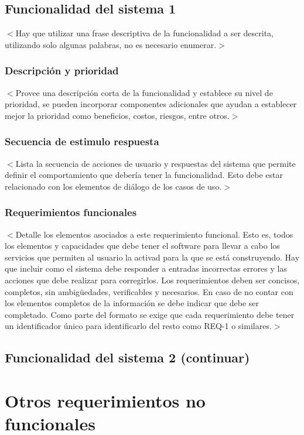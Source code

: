 \documentclass{scrreprt}
\begin{document}
\section{Funcionalidad del sistema 1}
$<$Hay que utilizar una frase descriptiva de la funcionalidad a ser descrita, utilizando solo algunas palabras, no es necesario enumerar.$>$

\subsection{Descripción y prioridad}
$<$Provee una descripción corta de la funcionalidad y establece su nivel de prioridad, se pueden incorporar componentes adicionales que ayudan a establecer mejor la prioridad como beneficios, costos, riesgos, entre otros.$>$

\subsection{Secuencia de estimulo respuesta}
$<$Lista la secuencia de acciones de usuario y respuestas del sistema que permite definir el comportamiento que debería tener la funcionalidad. Esto debe estar relacionado con los elementos de diálogo de los casos de uso.$>$

\subsection{Requerimientos funcionales}
$<$Detalle los elementos asociados a este requerimiento funcional. Esto es, todos los elementos y capacidades que debe tener el software para llevar a cabo los servicios que permiten al usuario la activad para la que se está construyendo. Hay que incluir como el sistema debe responder a entradas incorrectas errores y las acciones que debe realizar para corregirlos. Los requerimientos deben ser concisos, completos, sin ambigüedades, verificables y necesarios. En caso de no contar con los elementos completos de la información se debe indicar que debe ser completado. Como parte del formato se exige que cada requerimiento debe tener un identificador único para identificarlo del resto como REQ-1 o similares.$>$

\section{Funcionalidad del sistema 2 (continuar)}


\chapter{Otros requerimientos no funcionales}
\end{document}
